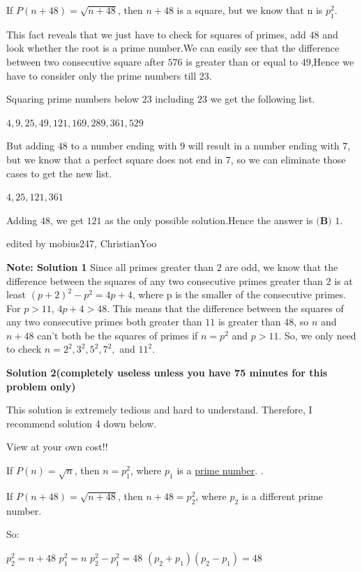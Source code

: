 \begin{enumerate}
 If $P(n+48) = \sqrt{n+48}$, then $n + 48$ is a square, but we know that n is $p_{1}^{2}$.

 
This fact reveals that we just have to check for squares of primes, add $48$ and look whether the root is a prime number.We can easily see that the difference between two consecutive square after $576$ is greater than or equal to $49$,Hence we have to consider only the prime numbers till $23$.

 Squaring prime numbers below $23$ including $23$ we get the following list.

 $4 , 9 , 25 , 49 , 121, 169 , 289 , 361 , 529$

 But adding $48$ to a number ending with $9$ will result in a number ending with $7$, but we know that a perfect square does not end in $7$, so we can eliminate those cases to get the new list.

 $4 , 25 , 121 , 361$

 Adding $48$, we get $121$ as the only possible solution.Hence the answer is $\boxed{\textbf{(B) }1}$.

 edited by mobius247, ChristianYoo

 \textbf{Note: Solution 1} Since all primes greater than $2$ are odd, we know that the difference between the squares of any two consecutive primes greater than $2$ is at least $(p+2)^2-p^2=4p+4$, where p is the smaller of the consecutive primes. For $p>11$, $4p+4>48$. This means that the difference between the squares of any two consecutive primes both greater than $11$ is greater than $48$, so $n$ and $n+48$ can't both be the squares of primes if $n=p^2$ and $p>11$. So, we only need to check $n=2^2, 3^2, 5^2, 7^2,$ and $11^2$.

 



\textbf{Solution 2(completely useless unless you have 75 minutes for this problem only)}

This solution is extremely tedious and hard to understand. Therefore, I recommend solution 4 down below. 

 View at your own cost!!

 
If $P(n) = \sqrt{n}$, then $n = p_{1}^{2}$, where $p_{1}$ is a \href{https://artofproblemsolving.com/wiki/index.php?title=Prime\_number}{prime number}. .

 If $P(n+48) = \sqrt{n+48}$, then $n+48 = p_{2}^{2}$, where $p_{2}$ is a different prime number. 

 So: 

 $p_{2}^{2} = n+48$
$p_{1}^{2} = n$
$p_{2}^{2} - p_{1}^{2} = 48$
$(p_{2}+p_{1})(p_{2}-p_{1})=48$


\end{enumerate}
